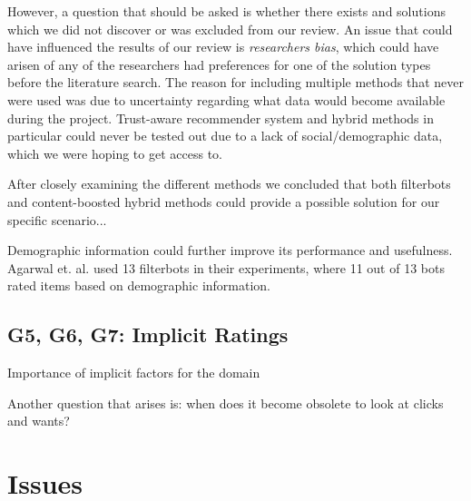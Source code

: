 However, a question that should be asked is whether there exists and solutions which we did not discover or was excluded from our review. An issue that could have influenced the results of our review is \emph{researchers bias}, which could have arisen of any of the researchers had preferences for one of the solution types before the literature search. The reason for including multiple methods that never were used was due to uncertainty regarding what data would become available during the project. Trust-aware recommender system and hybrid methods in particular could never be tested out due to a lack of social/demographic data, which we were hoping to get access to.



After closely examining the different methods we concluded that both filterbots and content-boosted hybrid methods could provide a possible solution for
our specific scenario...

Demographic information could further improve its performance and usefulness. Agarwal et. al. \cite{Agarwal2009} used 13 filterbots in their experiments, where 11 out of 13 bots rated items based on demographic information.


\subsection{G5, G6, G7: Implicit Ratings}
\label{sec:implicit-discussion}

Importance of implicit factors for the domain

Another question that arises is: when does it become obsolete to look at clicks and wants?






\section{Issues}\label{sec:issues}

